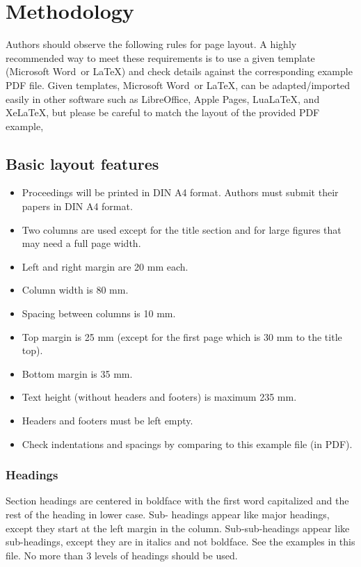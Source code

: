 \documentclass[a4paper]{article}
\begin{document}
\section{Methodology}
Authors should observe the following rules for page layout. A highly recommended way to meet these requirements is to use a given template (Microsoft Word\textregistered\ or \LaTeX) and check details against the corresponding example PDF file. Given templates, Microsoft Word\textregistered\ or \LaTeX, can be adapted/imported easily in other software such as LibreOffice, Apple Pages, Lua\LaTeX, and Xe\LaTeX, but please be careful to match the layout of the provided PDF example, 

\subsection{Basic layout features}

\begin{itemize}
\item Proceedings will be printed in DIN A4 format. Authors must submit their papers in DIN A4 format.
\item Two columns are used except for the title section and for large figures that may need a full page width.
\item Left and right margin are 20 mm each. 
\item Column width is 80 mm. 
\item Spacing between columns is 10 mm.
\item Top margin is 25 mm (except for the first page which is 30 mm to the title top).
\item Bottom margin is 35 mm.
\item Text height (without headers and footers) is maximum 235 mm.
\item Headers and footers must be left empty.
\item Check indentations and spacings by comparing to this example file (in PDF).
\end{itemize}

\subsubsection{Headings}

Section headings are centered in boldface with the first word capitalized and the rest of the heading in lower case. Sub- headings appear like major headings, except they start at the left margin in the column. Sub-sub-headings appear like sub-headings, except they are in italics and not boldface. See the examples in this file. No more than 3 levels of headings should be used.
\end{document}
